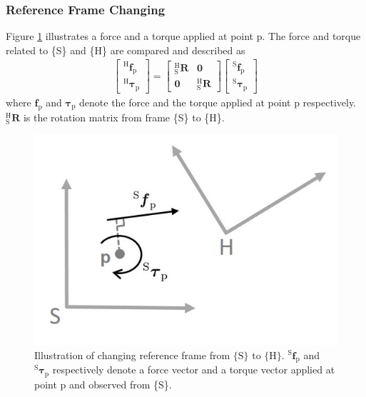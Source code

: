 \subsubsection{Reference Frame Changing}
\hspace{6mm}Figure \ref{fig:sensor_comp1} illustrates a force and a torque applied at point p. The force and torque related to \{S\} and \{H\} are compared and described as   
\begin{equation}
\begin{split}
\begin{bmatrix}
^\mathrm{H}\boldsymbol{f}_\mathrm{p}\\ 
^\mathrm{H}\boldsymbol{\tau}_\mathrm{p}
\end{bmatrix}
=
\begin{bmatrix}
_\mathrm{S}^\mathrm{H}\mathbf{R} & \boldsymbol{0}\\ 
\boldsymbol{0} & _\mathrm{S}^\mathrm{H}\mathbf{R}
\end{bmatrix}
\begin{bmatrix}
^\mathrm{S}\boldsymbol{f}_\mathrm{p}\\ 
^\mathrm{S}\boldsymbol{\tau}_\mathrm{p}
\end{bmatrix}
\end{split}
\end{equation}
where $\boldsymbol{f}_\mathrm{p}$ and $\boldsymbol{\tau}_\mathrm{p}$ denote the force and the torque applied at point p respectively. $_\mathrm{S}^\mathrm{H}\mathbf{R}$ is the rotation matrix from frame \{S\} to \{H\}.
\begin{figure}[htbp]
\begin{center}
\includegraphics[width=0.6\linewidth]{Images/sensor_comp 1.jpg}
\caption{
Illustration of changing reference frame from $\{\mathrm{S}\} $ to $\{\mathrm{H}\}$. $^\mathrm{S}\boldsymbol{f}_\mathrm{p}$ and $^\mathrm{S}\boldsymbol{\tau}_\mathrm{p}$ respectively denote a force vector and a torque vector applied at point p and observed from \{S\}.
}\label{fig:sensor_comp1}
\end{center}
\end{figure}

